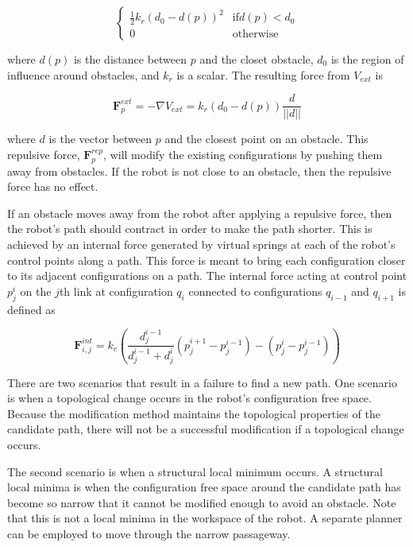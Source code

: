 \documentclass[10pt,conference]{ieeeconf}
\begin{document}
\[ \begin{cases} 
      \frac{1}{2}k_r(d_0 - d(p))^2 & \text{if}  d(p) < d_0 \\
      0 & \text{otherwise}
   \end{cases}
\]


where $d(p)$ is the distance between $p$ and the closet obstacle, $d_0$ is the region of influence around obstacles, and $k_r$ is a scalar. The resulting force from $V_{ext}$ is

\begin{equation}
\textbf{F}^{ext}_p = -\nabla V_{ext} = k_r(d_0-d(p))\frac{d}{||d||}
\end{equation}

where $d$ is the vector between $p$ and the closest point on an obstacle. This repulsive force, $\textbf{F}^{rep}_p$, will modify the existing configurations by pushing them away from obstacles. If the robot is not close to an obstacle, then the repulsive force has no effect.

If an obstacle moves away from the robot after applying a repulsive force, then the robot's path should contract in order to make the path shorter. This is achieved by an internal force generated by virtual springs at each of the robot's control points along a path. This force is meant to bring each configuration closer to its adjacent configurations on a path. The internal force acting at control point $p^i_j$ on the $j$th link at configuration $q_i$ connected to configurations $q_{i-1}$ and $q_{i+1}$ is defined as

\begin{equation}
\textbf{F}^{int}_{i,j} = k_c\left( \frac{d^{i-1}_j}{d^{i-1}_j+d^i_j} (p^{i+1}_j-p^{i-1}_j)-(p^i_j-p^{i-1}_j) \right)
\end{equation}




There are two scenarios that result in a failure to find a new path. One scenario is when a topological change occurs in the robot's configuration free space. Because the modification method maintains the topological properties of the candidate path, there will not be a successful modification if a topological change occurs.

The second scenario is when a structural local minimum occurs. A structural local minima is when the configuration free space around the candidate path has become so narrow that it cannot be modified enough to avoid an obstacle. Note that this is not a local minima in the workspace of the robot. A separate planner can be employed to move through the narrow passageway.
\end{document}
